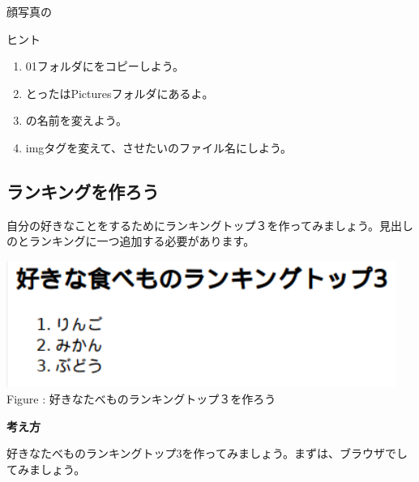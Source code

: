 \documentclass[a4paper,12pt]{jarticle}
\begin{document}
顔写真の

ヒント

\begin{enumerate}
  \item
        01フォルダにをコピーしよう。
  \item とったはPicturesフォルダにあるよ。
  \item {}の名前を変えよう。
  \item
        imgタグを変えて、させたいのファイル名にしよう。
\end{enumerate}

\bigskip


\bigskip

\clearpage
{}
\subsection{\theExercise ランキングを作ろう}
自分の好きなことをするためにランキングトップ３を作ってみましょう。見出しのとランキングに一つ追加する必要があります。



\bigskip


\begin{minipage}{12.716cm}
  {\upshape
    \includegraphics[width=12.716cm,height=4.14cm]{textbook-img178.png}
    \newline
    Figure :
    好きなたべものランキングトップ３を作ろう}
\end{minipage}


\bigskip


\bigskip

\textbf{考え方}



\bigskip



好きなたべものランキングトップ3を作ってみましょう。まずは、ブラウザでしてみましょう。
\end{document}
